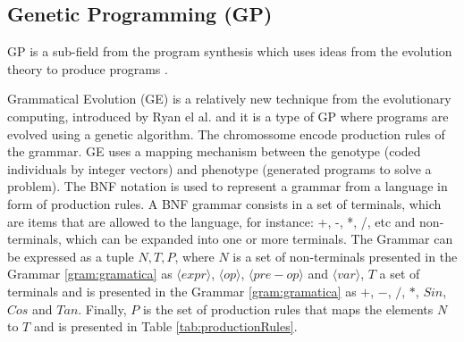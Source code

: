 \documentclass[conference]{IEEEtran}
\begin{document}
\subsection{Genetic Programming {(GP)}}
\label{sec:geneticprogamming}
 GP is a sub-field from the program synthesis which uses ideas from the evolution theory to produce programs \cite{burke2013hyper}. 



Grammatical Evolution (GE) is a relatively new technique from the evolutionary computing, introduced by Ryan el al. \cite{ryan1998grammatical} and it is a type of GP where programs are evolved using a genetic algorithm. The chromossome encode production rules of the grammar. GE uses a mapping mechanism between the genotype (coded individuals by integer vectors) and phenotype (generated programs to solve a problem). The BNF notation is used to represent a grammar from a language in form of production rules. A BNF grammar consists in a set of terminals, which are items that are allowed to the language, for instance: +, -, *, /, etc and non-terminals, which can be expanded into one or more terminals. The Grammar can be expressed as a tuple ${N,T,P}$, where $N$ is a set of non-terminals presented in the Grammar \ref{gram:gramatica} as $\langle expr \rangle$, $\langle op \rangle$, $\langle pre - op \rangle$ and $\langle var \rangle$,  $T$ a set of terminals and is presented in the Grammar \ref{gram:gramatica} as $+$, $-$, $/$, $*$, $Sin$, $Cos$ and $Tan$. Finally, $P$ is the set of production rules that maps the elements $N$ to $T$ and is presented in Table \ref{tab:productionRules}.



%
%
\end{document}
